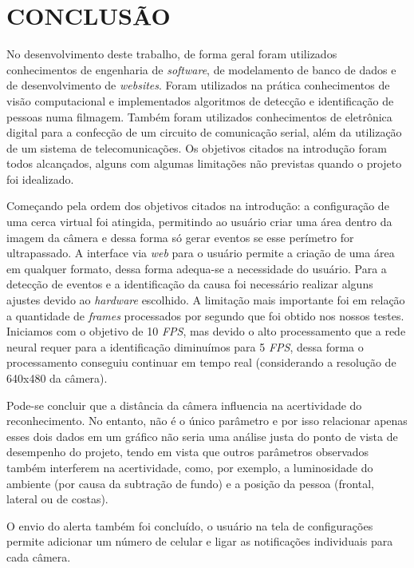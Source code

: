 \chapter{CONCLUSÃO}
\label{chap:conclusao}


No desenvolvimento deste trabalho, de forma geral foram utilizados conhecimentos de engenharia de \textit{software}, de modelamento de banco de dados e de desenvolvimento de \textit{websites}. Foram utilizados na prática conhecimentos de visão computacional e implementados algoritmos de detecção e identificação de pessoas numa filmagem. Também foram utilizados conhecimentos de eletrônica digital para a confecção de um circuito de comunicação serial, além da utilização de um sistema de telecomunicações. Os objetivos citados na introdução foram todos alcançados, alguns com algumas limitações não previstas quando o projeto foi idealizado.

Começando pela ordem dos objetivos citados na introdução: a configuração de uma cerca virtual foi atingida, permitindo ao usuário criar uma área dentro da imagem da câmera e dessa forma só gerar eventos se esse perímetro for ultrapassado. A interface via \textit{web} para o usuário permite a criação de uma área em qualquer formato, dessa forma adequa-se a necessidade do usuário.
Para a detecção de eventos e a identificação da causa foi necessário realizar alguns ajustes devido ao \textit{hardware} escolhido. A limitação mais importante foi em relação a quantidade de \textit{frames} processados por segundo que foi obtido nos nossos testes. Iniciamos com o objetivo de 10 \textit{FPS}, mas devido o alto processamento que a rede neural requer para a identificação diminuímos para 5 \textit{FPS}, dessa forma o processamento conseguiu continuar em tempo real (considerando a resolução de 640x480 da câmera).

Pode-se concluir que a distância da câmera influencia na acertividade do reconhecimento. No entanto, não é o único parâmetro e por isso relacionar apenas esses dois dados em um gráfico não seria uma análise justa do ponto de vista de desempenho do projeto, tendo em vista que outros parâmetros observados também interferem na acertividade, como, por exemplo, a luminosidade do ambiente (por causa da subtração de fundo) e a posição da pessoa (frontal, lateral ou de costas).

O envio do alerta também foi concluído, o usuário na tela de configurações permite adicionar um número de celular e ligar as notificações individuais para cada câmera.

